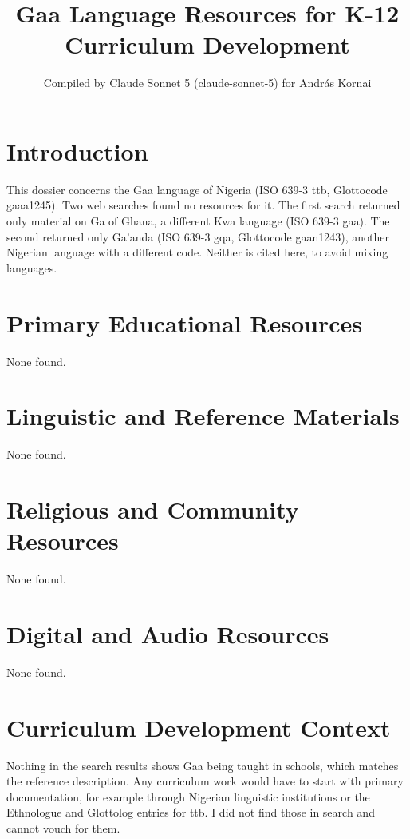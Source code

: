 \documentclass[12pt]{article}
\title{Gaa Language Resources for K-12 Curriculum Development}
\author{Compiled by Claude Sonnet 5 (claude-sonnet-5) for Andr\'as Kornai}
\date{}
\begin{document}
\maketitle

\section{Introduction}
This dossier concerns the Gaa language of Nigeria (ISO 639-3 ttb, Glottocode gaaa1245). Two web searches found no resources for it. The first search returned only material on Ga of Ghana, a different Kwa language (ISO 639-3 gaa). The second returned only Ga'anda (ISO 639-3 gqa, Glottocode gaan1243), another Nigerian language with a different code. Neither is cited here, to avoid mixing languages.

\section{Primary Educational Resources}
None found.

\section{Linguistic and Reference Materials}
None found.

\section{Religious and Community Resources}
None found.

\section{Digital and Audio Resources}
None found.

\section{Curriculum Development Context}
Nothing in the search results shows Gaa being taught in schools, which matches the reference description. Any curriculum work would have to start with primary documentation, for example through Nigerian linguistic institutions or the Ethnologue and Glottolog entries for ttb. I did not find those in search and cannot vouch for them.
\end{document}
